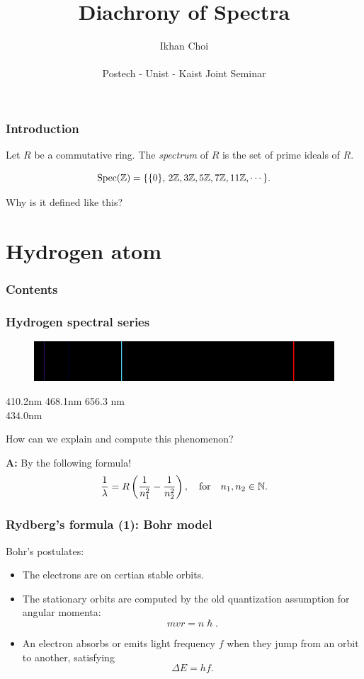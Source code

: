 \documentclass[10pt,handout]{beamer}
\title{Diachrony of Spectra}
\author{Ikhan Choi \\ \quad \\ Postech - Unist - Kaist Joint Seminar}
\begin{document}
\maketitle

\begin{frame}
\frametitle{Introduction}
  \pause
  \begin{defn}
    Let $R$ be a commutative ring.
    The \emph{spectrum} of $R$ is the set of prime ideals of $R$.
  \end{defn}
  \pause
  \begin{ex}
  	\[\operatorname{Spec}(\mathbb{Z})=\{\{0\},\,2\mathbb{Z},3\mathbb{Z},5\mathbb{Z},7\mathbb{Z},11\mathbb{Z},\cdots\,\}.\]
  \end{ex}
  \pause
  \begin{qn}
    Why is it defined like this?
  \end{qn}
\end{frame}


\section{Hydrogen atom}
\begin{frame}
\frametitle{Contents}
  \tableofcontents[currentsection]
\end{frame}

\begin{frame}
\frametitle{Hydrogen spectral series}
  \begin{figure}\includegraphics[scale=.4]{emission.png}\end{figure}
  \pause 410.2nm \hspace{3em} 468.1nm \hspace{13em} 656.3 nm\\ \hspace{2em} 434.0nm\\
  \bigskip
  \pause
  \begin{qn}
    How can we explain and compute this phenomenon?
  \end{qn}
  \pause \textbf{A:} By the following formula!
  \[\frac1\lambda=R\left(\frac1{n_1^2}-\frac1{n_2^2}\right),\quad\text{for}\quad n_1,n_2\in\mathbb{N}.\]
\end{frame}

\begin{frame}
\frametitle{Rydberg's formula (1): Bohr model}
  Bohr's postulates:\pause
  \begin{itemize}[<+->]
    \item The electrons are on certian stable orbits.
    \item The stationary orbits are computed by the old quantization assumption for angular momenta:
    \[mvr=n\hslash.\]
    \item An electron absorbs or emits light frequency $f$ when they jump from an orbit to another, satisfying
    \[\Delta E=hf.\]
  \end{itemize}
\end{frame}
\end{document}
